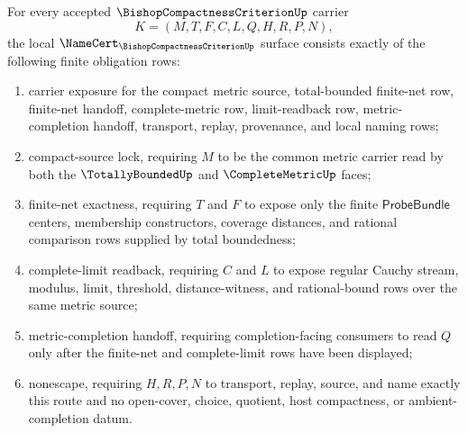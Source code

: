 \begin{theorem}
\label{thm:bishop-compactness-criterion-namecert-obligations}
For every accepted $\BishopCompactnessCriterionUp$ carrier
$$
K=(M,T,F,C,L,Q,H,R,P,N),
$$
the local $\NameCert_{\BishopCompactnessCriterionUp}$ surface consists exactly of the following finite obligation rows:
\begin{enumerate}
\item carrier exposure for the compact metric source, total-bounded finite-net row, finite-net handoff, complete-metric row, limit-readback row, metric-completion handoff, transport, replay, provenance, and local naming rows;
\item compact-source lock, requiring $M$ to be the common metric carrier read by both the $\TotallyBoundedUp$ and $\CompleteMetricUp$ faces;
\item finite-net exactness, requiring $T$ and $F$ to expose only the finite $\mathsf{ProbeBundle}$ centers, membership constructors, coverage distances, and rational comparison rows supplied by total boundedness;
\item complete-limit readback, requiring $C$ and $L$ to expose regular Cauchy stream, modulus, limit, threshold, distance-witness, and rational-bound rows over the same metric source;
\item metric-completion handoff, requiring completion-facing consumers to read $Q$ only after the finite-net and complete-limit rows have been displayed;
\item nonescape, requiring $H,R,P,N$ to transport, replay, source, and name exactly this route and no open-cover, choice, quotient, host compactness, or ambient-completion datum.
\end{enumerate}
\end{theorem}
